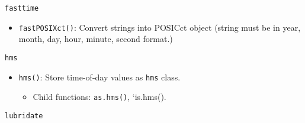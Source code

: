 \documentclass[]{book}
\providecommand{\tightlist}{%
  \setlength{\itemsep}{0pt}\setlength{\parskip}{0pt}}
\begin{document}
\texttt{fasttime}

\begin{itemize}
\tightlist
\item
  \texttt{fastPOSIXct()}: Convert strings into POSICct object (string must be in year, month, day, hour, minute, second format.)
\end{itemize}

\texttt{hms}

\begin{itemize}
\tightlist
\item
  \texttt{hms()}: Store time-of-day values as \texttt{hms} class.

  \begin{itemize}
  \tightlist
  \item
    Child functions: \texttt{as.hms()}, `is.hms().
  \end{itemize}
\end{itemize}

\texttt{lubridate}
\end{document}
